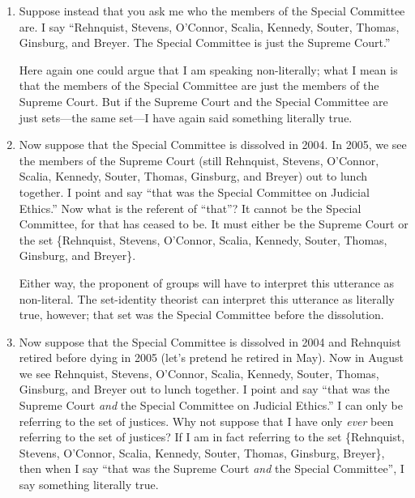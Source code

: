 \documentclass[11pt]{article}
\begin{document}
\begin{spacing}{1.5}
\begin{enumerate}
  \item Suppose instead that you ask me who the members of the Special
    Committee are.  I say ``Rehnquist, Stevens, O'Connor, Scalia,
    Kennedy, Souter, Thomas, Ginsburg, and Breyer.  The Special
    Committee is just the Supreme Court.''  

    Here again one could argue that I am speaking non-literally; what
    I mean is that the members of the Special Committee are just the
    members of the Supreme Court.  But if the Supreme Court and the
    Special Committee are just sets---the same set---I have again said
    something literally true.

  \item Now suppose that the Special Committee is dissolved in 2004.
    In 2005, we see the members of the Supreme Court (still Rehnquist,
    Stevens, O'Connor, Scalia, Kennedy, Souter, Thomas, Ginsburg, and
    Breyer) out to lunch together.  I point and say ``that was the
    Special Committee on Judicial Ethics.''  Now what is the referent
    of ``that''?  It cannot be the Special Committee, for that has
    ceased to be.  It must either be the Supreme Court or the set
    \{Rehnquist, Stevens, O'Connor, Scalia, Kennedy, Souter, Thomas,
    Ginsburg, and Breyer\}.  

    Either way, the proponent of groups will have to interpret this
    utterance as non-literal.  The set-identity theorist can interpret
    this utterance as literally true, however; that set was the
    Special Committee before the dissolution.

  \item Now suppose that the Special Committee is dissolved in 2004
    and Rehnquist retired before dying in 2005 (let's pretend he
    retired in May).  Now in August we see Rehnquist, Stevens,
    O'Connor, Scalia, Kennedy, Souter, Thomas, Ginsburg, and Breyer
    out to lunch together.  I point and say ``that was the Supreme
    Court {\em and} the Special Committee on Judicial Ethics.''  I can
    only be referring to the set of justices.  Why not suppose that I
    have only {\em ever} been referring to the set of justices?  If I
    am in fact referring to the set \{Rehnquist, Stevens, O'Connor,
    Scalia, Kennedy, Souter, Thomas, Ginsburg, Breyer\}, then when I
    say ``that was the Supreme Court {\em and} the Special
    Committee'', I say something literally true.
\end{enumerate}


\end{spacing}
\end{document}
